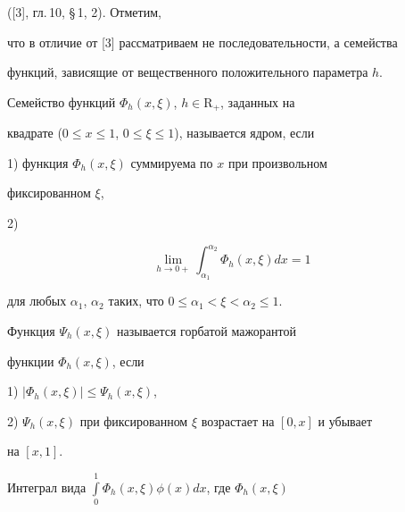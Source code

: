 ([3], гл.\,10, \S\,1, 2). Отметим, 


что в отличие от [3] рассматриваем не последовательности, а семейства 


функций, зависящие от вещественного положительного параметра $h$. 


 


\begin{defn} 


Семейство функций $\Phi_h(x,\xi)$, $h\in\mathrm R_+$, заданных на 


квадрате ($0\le x\le1$, $0\le\xi\le1$), называется ядром, если 


 


1) функция $\Phi_h(x,\xi)$ суммируема по $x$ при произвольном 


фиксированном $\xi$, 


 


2) 


\begin{equation} 


\lim_{h\to0+}\int^{\alpha_2}_{\alpha_1}\Phi_h(x,\xi)dx=1 


\end{equation} 


для любых $\alpha_1$, $\alpha_2$ таких, что $0\le\alpha_1<\xi<\alpha_2\le1$. 


\end{defn} 


 


\begin{defn} 


Функция $\Psi_h(x,\xi)$ называется горбатой мажорантой 


функции $\Phi_h(x,\xi)$, если 


 


1) $|\Phi_h(x,\xi)|\le\Psi_h(x,\xi)$, 


 


2) $\Psi_h(x,\xi)$ при фиксированном $\xi$ возрастает на $[0,x]$ и убывает 


на $[x,1]$. 


\end{defn} 


 


Интеграл вида $\int\limits^1_0\Phi_h(x,\xi)\phi(x)dx$, где $\Phi_h(x,\xi)$ 


